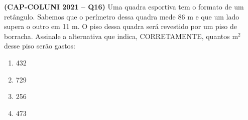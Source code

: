 \textbf{(CAP-COLUNI 2021 -- Q16)} Uma quadra esportiva tem o formato de um retângulo. Sabemos que o perímetro dessa quadra mede 86 m e que um lado supera o outro em 11 m. O piso dessa quadra será revestido por um piso de borracha. Assinale a alternativa que indica, CORRETAMENTE, quantos m$^2$ desse piso serão gastos:

\begin{enumerate}
	\item 432
	\item 729
	\item 256
	\item 473
\end{enumerate}
